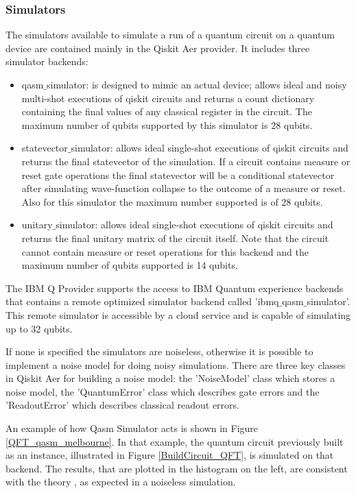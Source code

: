 \subsubsection{Simulators}

The simulators available to simulate a run of a quantum circuit on a quantum device are contained mainly in the Qiskit Aer provider. It includes three simulator backends:

\begin{itemize}
	\item {\selectfont qasm$\_$simulator}: is designed to mimic an actual device; allows ideal and noisy multi-shot executions of qiskit circuits and returns a count dictionary containing the final values of any classical register in the circuit.  The maximum number of qubits supported by this simulator is 28 qubits.
	\item {\selectfont statevector$\_$simulator}: allows ideal single-shot executions of qiskit circuits and returns the final statevector of the simulation. If a circuit contains measure or reset gate operations the 	final statevector will be a conditional statevector after simulating wave-function collapse to the outcome of a measure or reset. Also for this simulator the maximum number supported is of 28 qubits.
	\item {\selectfont unitary$\_$simulator}: allows ideal single-shot executions of qiskit circuits and returns the final unitary matrix of the circuit itself. Note that the circuit cannot contain measure or reset operations 		for this backend and the maximum number of qubits supported is 14 qubits.
\end{itemize}
\vspace{0.2cm}
\noindent The IBM Q Provider supports the access to IBM Quantum experience backends that contains a remote optimized simulator backend called  '{\selectfont ibmq$\_$qasm$\_$simulator}'. This remote simulator is accessible by a cloud service and is capable of simulating up to 32 qubits.

If none is specified the simulators are noiseless, otherwise it is possible to implement a noise model for doing noisy simulations. There are three key classes in Qiskit Aer for building a noise model: the 'NoiseModel' class which stores a noise model, the 'QuantumError' class which describes gate errors and the 'ReadoutError' which describes classical readout errors.


An example of how Qasm Simulator acts is shown in Figure \ref{QFT_qasm_melbourne}. In that example, the quantum circuit previously built as an instance, illustrated in Figure \ref{BuildCircuit_QFT}, is simulated on that backend. The results, that are plotted in the histogram on the left, are consistent with the theory \cite{Nielsen}, as expected in a noiseless simulation.




